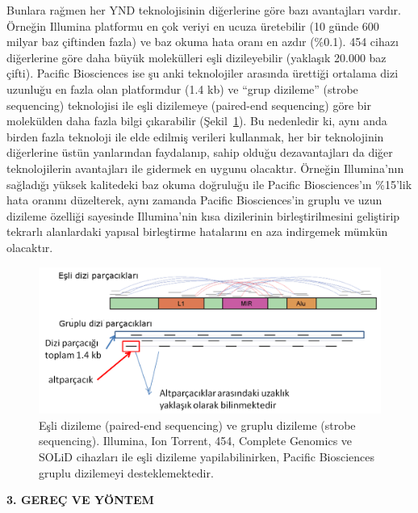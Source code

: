 \documentclass[11pt]{article}
\begin{document}
Bunlara rağmen her YND teknolojisinin diğerlerine göre bazı avantajları vardır. Örneğin Illumina platformu en çok veriyi en ucuza üretebilir (10 günde 600 milyar baz çiftinden fazla) ve baz okuma hata oranı en azdır (\%0.1). 454 cihazı diğerlerine göre daha büyük molekülleri eşli dizileyebilir (yaklaşık 20.000 baz çifti). Pacific Biosciences ise şu anki teknolojiler arasında ürettiği ortalama dizi uzunluğu en fazla olan platformdur (1.4 kb) ve ``grup dizileme'' (strobe sequencing) teknolojisi ile eşli dizilemeye (paired-end sequencing) göre bir molekülden daha fazla bilgi çıkarabilir (Şekil~\ref{fig:strobe}). Bu nedenledir ki, aynı anda birden fazla teknoloji ile elde edilmiş verileri kullanmak, her bir teknolojinin diğerlerine üstün yanlarından faydalanıp, sahip olduğu dezavantajları da diğer teknolojilerin avantajları ile gidermek en uygunu olacaktır. Örneğin Illumina'nın sağladığı yüksek kalitedeki baz okuma doğruluğu ile Pacific Biosciences'ın \%15'lik hata oranını düzelterek, aynı zamanda Pacific Biosciences'in gruplu ve uzun dizileme özelliği sayesinde Illumina'nin kısa dizilerinin birleştirilmesini geliştirip tekrarlı alanlardaki yapısal birleştirme hatalarını en aza indirgemek mümkün olacaktır.

\begin{figure}[htb]
\begin{center}
  \includegraphics[scale=0.75]{strobe.png}
\end{center}
\caption{Eşli dizileme (paired-end sequencing) ve gruplu dizileme (strobe sequencing). Illumina, Ion Torrent, 454, Complete Genomics ve SOLiD cihazları ile eşli dizileme yapilabilinirken, Pacific Biosciences gruplu dizilemeyi desteklemektedir.}
\label{fig:strobe}
\end{figure}


\clearpage


\begin{center}
{\bf \Large 3. GEREÇ VE YÖNTEM} 
\end{center}
\noindent
\end{document}

